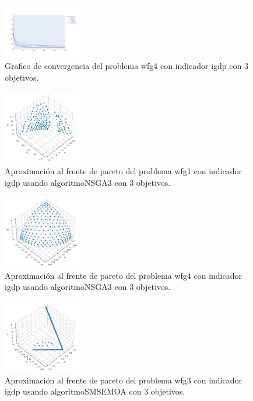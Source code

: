\documentclass{article}
\begin{document}
\clearpage
\begin{figure}
	\includegraphics[width=0.3\textwidth]{wfg4_igdp_3_gc.png}
	\caption{Grafico de convergencia del problema wfg4 con indicador igdp con 3 objetivos.}
\end{figure}
\begin{figure}
	\includegraphics[width=0.3\textwidth]{NSGA3_wfg1_igdp_3_fp.png}
	\caption{Aproximación al frente de pareto del problema wfg1 con indicador igdp usando algoritmoNSGA3 con 3 objetivos.}
\end{figure}
\begin{figure}
	\includegraphics[width=0.3\textwidth]{NSGA3_wfg4_igdp_3_fp.png}
	\caption{Aproximación al frente de pareto del problema wfg4 con indicador igdp usando algoritmoNSGA3 con 3 objetivos.}
\end{figure}
\clearpage
\begin{figure}
	\includegraphics[width=0.3\textwidth]{SMSEMOA_wfg3_igdp_3_fp.png}
	\caption{Aproximación al frente de pareto del problema wfg3 con indicador igdp usando algoritmoSMSEMOA con 3 objetivos.}
\end{figure}
\end{document}
